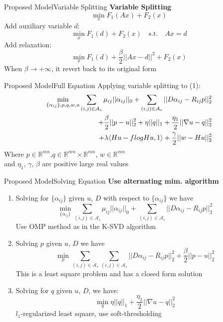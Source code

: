 \documentclass{beamer}
\begin{document}
\begin{frame}{Proposed Model}{Variable Splitting}
\textbf{Variable Splitting}
\[
    \min_{x} F_1(Ax)+F_2(x)
\]
Add auxiliary variable $d$:
\[
    \min_{x} F_1(d)+F_2(x) \quad \textrm{s.t.} \quad Ax=d
\]
Add relaxation:
\[
    \min_{x} F_1(d)+ \frac{\beta}{2}||Ax-d||^2 + F_2(x)
\]
When $\beta \to +\infty$, it revert back to its original form
\end{frame}


\begin{frame}{Proposed Model}{Full Equation}
Applying variable splitting to (1):
\begin{equation}
\begin{aligned}
    \min_{\{\alpha_{ij}\}, p, q, w, u} \sum_{(i,j) \in \mathcal{A}_s}{} \mu_{ij}||\alpha_{ij}||_0 
    + \sum_{(i,j) \in \mathcal{A}_s}{} ||D\alpha_{ij} - R_{ij}p||^2_2  \\  
    + \frac{\beta}{2}||p-u||^2_2 + \eta||q||_1 + \frac{\eta_1}{2} ||\nabla u - q||^2_2 \\ 
    + \lambda\langle Hu-f\hspace{0.25pt}log Hu,1\rangle + \frac{\gamma}{2}||w - Hu||^2_2 
\end{aligned}
\end{equation}
Where $p \in \mathbb{R}^{mn}$,$q \in \mathbb{R}^{mn} \times \mathbb{R}^{mn}$, $w \in \mathbb{R}^{mn}$ \\ and 
$\eta_1$,  $\gamma$, $\beta$ are positive large real values
\end{frame}


\begin{frame}{Proposed Model}{Solving Equation}
\textbf{Use alternating mim. algorithm }
    \setlength{\abovedisplayskip}{3pt}
    \setlength{\belowdisplayskip}{3pt}

\begin{enumerate}

    \item Solving for $\{\alpha_{ij}\}$ given $u$, $D$ with respect to $\{\alpha_{ij}\}$ we have 
    \[
         \min_{\{\alpha_{ij}\}} \sum_{(i,j) \in \mathcal{A}_s}{} \mu_{ij}||\alpha_{ij}||_0 
         + \sum_{(i,j) \in \mathcal{A}_s}{} ||D\alpha_{ij} - R_{ij}p||^2_2  
    \]
    Use OMP method as in the K-SVD algorithm
    
    \item Solving $p$ given $u$, $D$ we have
    \[
      \min_{p} \sum_{(i,j) \in \mathcal{A}_s} \sum_{(i,j) \in \mathcal{A}_s}{} ||D\alpha_{ij} - R_{ij}p||^2_2 
      + \frac{\beta}{2}||p-u||^2_2 
    \]
    This is a least square problem and has a closed form solution
    \item Solving for $q$ given $u$, $D$, we have:
    \[
      \min_{q} \eta||q||_1+\frac{\eta_1 }{2}||\nabla u - q||^2_2
    \]
    $l_1$-regularized least square, use soft-thresholding 
\end{enumerate}
\end{frame}
\end{document}
